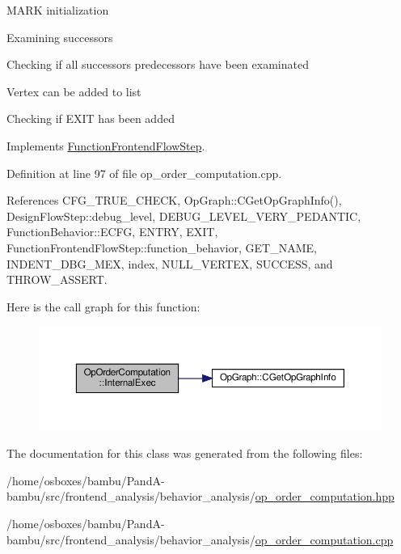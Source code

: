 M\+A\+RK initialization

Examining successors

Checking if all successor\textquotesingle{}s predecessors have been examinated

Vertex can be added to list

Checking if E\+X\+IT has been added 

Implements \hyperlink{classFunctionFrontendFlowStep_a00612f7fb9eabbbc8ee7e39d34e5ac68}{Function\+Frontend\+Flow\+Step}.



Definition at line 97 of file op\+\_\+order\+\_\+computation.\+cpp.



References C\+F\+G\+\_\+\+T\+R\+U\+E\+\_\+\+C\+H\+E\+CK, Op\+Graph\+::\+C\+Get\+Op\+Graph\+Info(), Design\+Flow\+Step\+::debug\+\_\+level, D\+E\+B\+U\+G\+\_\+\+L\+E\+V\+E\+L\+\_\+\+V\+E\+R\+Y\+\_\+\+P\+E\+D\+A\+N\+T\+IC, Function\+Behavior\+::\+E\+C\+FG, E\+N\+T\+RY, E\+X\+IT, Function\+Frontend\+Flow\+Step\+::function\+\_\+behavior, G\+E\+T\+\_\+\+N\+A\+ME, I\+N\+D\+E\+N\+T\+\_\+\+D\+B\+G\+\_\+\+M\+EX, index, N\+U\+L\+L\+\_\+\+V\+E\+R\+T\+EX, S\+U\+C\+C\+E\+SS, and T\+H\+R\+O\+W\+\_\+\+A\+S\+S\+E\+RT.

Here is the call graph for this function\+:
\nopagebreak
\begin{figure}[H]
\begin{center}
\leavevmode
\includegraphics[width=350pt]{d2/d8a/classOpOrderComputation_a9d0944110ff2b9f699c1390db8f22650_cgraph}
\end{center}
\end{figure}


The documentation for this class was generated from the following files\+:\begin{DoxyCompactItemize}
\item 
/home/osboxes/bambu/\+Pand\+A-\/bambu/src/frontend\+\_\+analysis/behavior\+\_\+analysis/\hyperlink{op__order__computation_8hpp}{op\+\_\+order\+\_\+computation.\+hpp}\item 
/home/osboxes/bambu/\+Pand\+A-\/bambu/src/frontend\+\_\+analysis/behavior\+\_\+analysis/\hyperlink{op__order__computation_8cpp}{op\+\_\+order\+\_\+computation.\+cpp}\end{DoxyCompactItemize}
